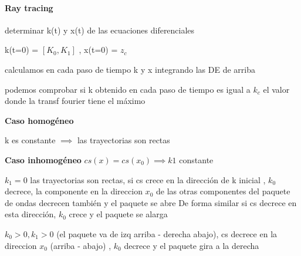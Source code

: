 \documentclass{article}
\begin{document}
\paragraph{Ray tracing}
\begin{description}
\item determinar k(t) y x(t) de las ecuaciones diferenciales
\item k(t=0) =  $[K_0, K_1]$ , x(t=0) = $z_c$
\item calculamos en cada paso de tiempo k y x integrando las DE de arriba
\item podemos comprobar si k obtenido en cada paso de tiempo es igual a $k_c$ el valor donde la transf fourier tiene el máximo 


\item 
\item \textbf{Caso homogéneo}
\item k es constante $\implies$ las trayectorias son rectas

\item \textbf{Caso inhomogéneo} $cs(x) = cs(x_0) \implies k1 $ constante  
\begin{description}
\item $k_1 = 0$ las trayectorias son rectas, si cs crece en la dirección de k inicial , $k_0$ decrece, la componente en la direccion $x_0$ de las otras
componentes del paquete de ondas decrecen también y el paquete se abre
De forma similar si cs decrece en esta dirección, $k_0$ crece y el paquete se alarga
\item $k_0>0, k_1>0$ (el paquete va de izq arriba - derecha abajo), cs decrece en la direccion $x_0$ (arriba - abajo) , $k_0$ decrece y el paquete gira a la derecha

\end{description}

\end{description}
\end{document}

